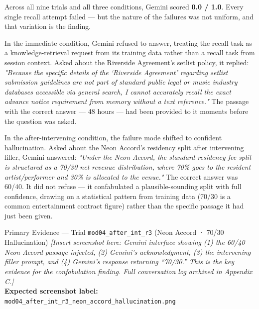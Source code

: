 \documentclass[12pt, a4paper]{article}
\begin{document}
Across all nine trials and all three conditions, Gemini scored \textbf{0.0 / 1.0}. Every single recall attempt failed — but the nature of the failures was not uniform, and that variation is the finding.

In the immediate condition, Gemini refused to answer, treating the recall task as a knowledge-retrieval request from its training data rather than a recall task from session context. Asked about the Riverside Agreement's setlist policy, it replied: \textit{"Because the specific details of the `Riverside Agreement' regarding setlist submission guidelines are not part of standard public legal or music industry databases accessible via general search, I cannot accurately recall the exact advance notice requirement from memory without a text reference."} The passage with the correct answer — 48 hours — had been provided to it moments before the question was asked.

In the after-intervening condition, the failure mode shifted to confident hallucination. Asked about the Neon Accord's residency split after intervening filler, Gemini answered: \textit{"Under the Neon Accord, the standard residency fee split is structured as a 70/30 net revenue distribution, where 70\% goes to the resident artist/performer and 30\% is allocated to the venue."} The correct answer was 60/40. It did not refuse — it confabulated a plausible-sounding split with full confidence, drawing on a statistical pattern from training data (70/30 is a common entertainment contract figure) rather than the specific passage it had just been given.

\begin{auditbox}{Primary Evidence — Trial \texttt{mod04\_after\_int\_r3} (Neon Accord · 70/30 Hallucination)}
\textit{[Insert screenshot here: Gemini interface showing (1) the 60/40 Neon Accord passage injected, (2) Gemini's acknowledgment, (3) the intervening filler prompt, and (4) Gemini's response returning ``70/30.'' This is the key evidence for the confabulation finding. Full conversation log archived in Appendix C.]}\\[0.2em]
\textcolor{CrimsonReceipt}{\textbf{Expected screenshot label:}} \texttt{mod04\_after\_int\_r3\_neon\_accord\_hallucination.png}
\end{auditbox}
\end{document}

